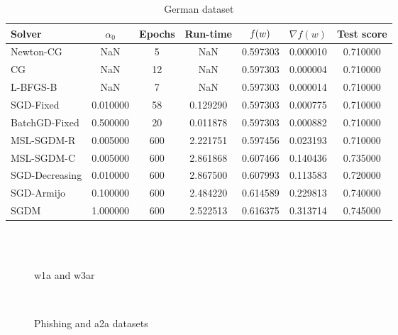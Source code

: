 \begin{table}
\caption{German dataset}
\label{tab:german-tab}
\centering
\begin{tabular}{lS[round-precision=3]S[drop-zero-decimal]S[round-precision=4]S[round-precision=6]S[exponent-mode=scientific]S[round-precision=6]}
\toprule
Solver & {$\alpha_0$} & {Epochs} & {Run-time} & {$\operatorname*{\mathit{f}}(w)$} & {$\nabla f(w)$} & {Test score} \\
\midrule
Newton-CG & NaN & 5 & NaN & 0.597303 & 0.000010 & 0.710000 \\
CG & NaN & 12 & NaN & 0.597303 & 0.000004 & 0.710000 \\
L-BFGS-B & NaN & 7 & NaN & 0.597303 & 0.000014 & 0.710000 \\
SGD-Fixed & 0.010000 & 58 & 0.129290 & 0.597303 & 0.000775 & 0.710000 \\
BatchGD-Fixed & 0.500000 & 20 & 0.011878 & 0.597303 & 0.000882 & 0.710000 \\
MSL-SGDM-R & 0.005000 & 600 & 2.221751 & 0.597456 & 0.023193 & 0.710000 \\
MSL-SGDM-C & 0.005000 & 600 & 2.861868 & 0.607466 & 0.140436 & 0.735000 \\
SGD-Decreasing & 0.010000 & 600 & 2.867500 & 0.607993 & 0.113583 & 0.720000 \\
SGD-Armijo & 0.100000 & 600 & 2.484220 & 0.614589 & 0.229813 & 0.740000 \\
SGDM & 1.000000 & 600 & 2.522513 & 0.616375 & 0.313714 & 0.745000 \\
\bottomrule
\end{tabular}
\end{table}

\begin{figure}
\centering
 \\
 \\
\caption[]{w1a and w3ar}
\label{fig:diab-breast}
\end{figure}

\begin{figure}
\centering
 \\
\caption[]{Phishing and a2a datasets}
\label{fig:phish-austr}
\end{figure}

